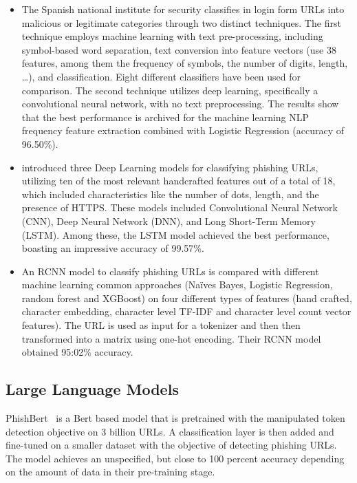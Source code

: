 \documentclass{article}
\begin{document}
    \begin{itemize}
        \item  The Spanish national institute for security classifies in\cite{PhishingLoginURLDetection} login form URLs into malicious or legitimate categories through two distinct techniques.
        The first technique employs machine learning with text pre-processing, including symbol-based word separation, text conversion into feature vectors (use 38 features, among them the frequency of symbols, the number of digits, length, \ldots), and classification.
        Eight different classifiers have been used for comparison.
        The second technique utilizes deep learning, specifically a convolutional neural network, with no text preprocessing.
        The results show that the best performance is archived for the machine learning NLP frequency feature extraction combined with Logistic Regression (accuracy of 96.50\%).


        \item \cite{EfficientDeepLearningPhishingDetection} introduced three Deep Learning models for classifying phishing URLs, utilizing ten of the most relevant handcrafted features out of a total of 18, which included characteristics like the number of dots, length, and the presence of HTTPS. These models included Convolutional Neural Network (CNN), Deep Neural Network (DNN), and Long Short-Term Memory (LSTM). Among these, the LSTM model achieved the best performance, boasting an impressive accuracy of 99.57\%.

        \item An RCNN model to classify phishing URLs is compared with different machine learning common approaches (Naïves Bayes, Logistic Regression, random forest and XGBoost) on four different types of features (hand crafted, character embedding, character level TF-IDF and character level count vector features)\cite{CharacterLevelCNN}.
        The URL is used as input for a tokenizer and then then transformed into a matrix using one-hot encoding.
        Their RCNN model obtained 95:02\% accuracy.

    \end{itemize}

    \subsection{Large Language Models}\label{subsec:large-language-models}
    PhishBert~\cite{PhishBert} is a Bert based model that is pretrained with the manipulated token detection objective on 3 billion URLs.
    A classification layer is then added and fine-tuned on a smaller dataset with the objective of detecting phishing URLs.
    The model achieves an unspecified, but close to 100 percent accuracy depending on the amount of data in their pre-training stage.
\end{document}
